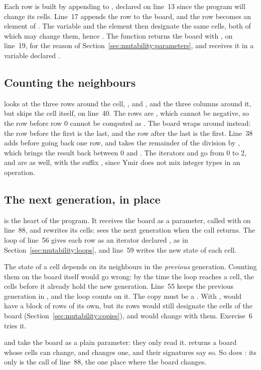 Each row is built by appending to , declared  on
line~13 since the program will change its cells. Line~17 appends the row to the
board, and the row becomes an element of . The variable 
and the element then designate the same cells, both of which may change them,
hence . The function returns the board with , on
line~19, for the reason of Section~\ref{sec:mutability:parameters}, and
 receives it in a variable declared .

\subsection{Counting the neighbours}

 looks at the three rows around the cell, ,
 and , and the three columns around it, but skips the
cell itself, on line~40. The rows are , which cannot be negative,
so the row before row 0 cannot be computed as . The board wraps
around instead: the row before the first is the last, and the row after the
last is the first. Line~38 adds  before going back one row, and
takes the remainder of the division by , which brings the result
back between 0 and . The iterators  and  go
from 0 to 2, and are  as well, with the suffix , since
Ymir does not mix integer types in an operation.

\subsection{The next generation, in place}

 is the heart of the program. It receives the board as a
 parameter, called with  on line~88, and rewrites
its cells:  sees the next generation when the call returns. The
loop of line~56 gives each row as an iterator declared , as in
Section~\ref{sec:mutability:loops}, and line~59 writes the new state of each
cell.

The state of a cell depends on its neighbours in the \textit{previous}
generation. Counting them on the board itself would go wrong: by the time the
loop reaches a cell, the cells before it already hold the new generation. Line~55
keeps the previous generation in , and the loop counts on it.
The copy must be a . With ,  would have
a block of rows of its own, but its rows would still designate the cells of the
board (Section~\ref{sec:mutability:copies}), and would change with them.
Exercise~6 tries it.

 and  take the board as a plain parameter: they
only read it.  returns a board whose cells can change, and
 changes one, and their signatures say so. So does :
its only  is the call of line~88, the one place where the board
changes.
